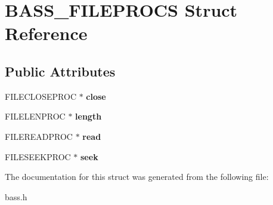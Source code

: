 \hypertarget{structBASS__FILEPROCS}{}\section{B\+A\+S\+S\+\_\+\+F\+I\+L\+E\+P\+R\+O\+C\+S Struct Reference}
\label{structBASS__FILEPROCS}
\subsection*{Public Attributes}
\begin{DoxyCompactItemize}
\item 
\hypertarget{structBASS__FILEPROCS_a6e99c31d56497cba4947973a445310cf}{}F\+I\+L\+E\+C\+L\+O\+S\+E\+P\+R\+O\+C $\ast$ {\bfseries close}\label{structBASS__FILEPROCS_a6e99c31d56497cba4947973a445310cf}

\item 
\hypertarget{structBASS__FILEPROCS_a70f1e1025d2f932d710c3c4f194316f3}{}F\+I\+L\+E\+L\+E\+N\+P\+R\+O\+C $\ast$ {\bfseries length}\label{structBASS__FILEPROCS_a70f1e1025d2f932d710c3c4f194316f3}

\item 
\hypertarget{structBASS__FILEPROCS_a8da5b2c3da32ce6f9eddb7086a4f3259}{}F\+I\+L\+E\+R\+E\+A\+D\+P\+R\+O\+C $\ast$ {\bfseries read}\label{structBASS__FILEPROCS_a8da5b2c3da32ce6f9eddb7086a4f3259}

\item 
\hypertarget{structBASS__FILEPROCS_ae878d5fa1534181ebbb3afc66b7afc42}{}F\+I\+L\+E\+S\+E\+E\+K\+P\+R\+O\+C $\ast$ {\bfseries seek}\label{structBASS__FILEPROCS_ae878d5fa1534181ebbb3afc66b7afc42}

\end{DoxyCompactItemize}


The documentation for this struct was generated from the following file\+:\begin{DoxyCompactItemize}
\item 
bass.\+h\end{DoxyCompactItemize}

